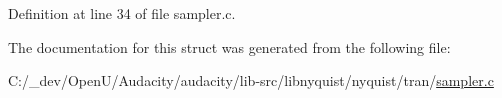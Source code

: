 Definition at line 34 of file sampler.\+c.



The documentation for this struct was generated from the following file\+:\begin{DoxyCompactItemize}
\item 
C\+:/\+\_\+dev/\+Open\+U/\+Audacity/audacity/lib-\/src/libnyquist/nyquist/tran/\hyperlink{libnyquist_2nyquist_2tran_2sampler_8c}{sampler.\+c}\end{DoxyCompactItemize}
